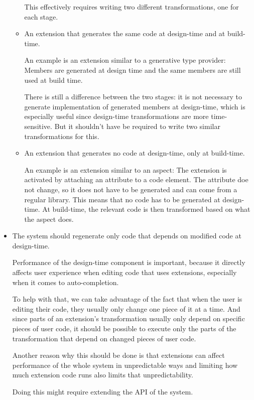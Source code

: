 \begin{itemize}
\begin{itemize}
This effectively requires writing two different transformations, one for each stage.

\item An extension that generates the same code at design-time and at build-time.

An example is an extension similar to a generative type provider: Members are generated at design time and the same members are still used at build time.

There is still a difference between the two stages: it is not necessary to generate implementation of generated members at design-time, which is especially useful since design-time transformations are more time-sensitive. But it shouldn't have be required to write two similar transformations for this.

\item An extension that generates no code at design-time, only at build-time.

An example is an extension similar to an aspect: The extension is activated by attaching an attribute to a code element. The attribute doe not change, so it does not have to be generated and can come from a regular library. This means that no code has to be generated at design-time. At build-time, the relevant code is then transformed based on what the aspect does.

\end{itemize}

\item The system should regenerate only code that depends on modified code at design-time.

Performance of the design-time component is important, because it directly affects user experience when editing code that uses extensions, especially when it comes to auto-completion.

To help with that, we can take advantage of the fact that when the user is editing their code, they usually only change one piece of it at a time. And since parts of an extension's transformation usually only depend on specific pieces of user code, it should be possible to execute only the parts of the transformation that depend on changed pieces of user code.

Another reason why this should be done is that extensions can affect performance of the whole system in unpredictable ways and limiting how much extension code runs also limits that unpredictability.

Doing this might require extending the \ac{API} of the system.


\end{itemize}
